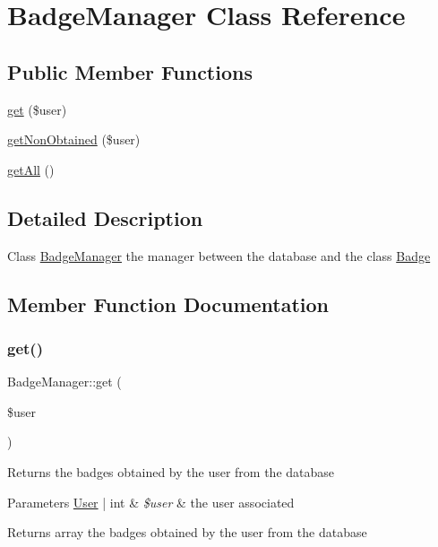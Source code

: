 \hypertarget{classBadgeManager}{}\section{Badge\+Manager Class Reference}
\label{classBadgeManager}
\subsection*{Public Member Functions}
\begin{DoxyCompactItemize}
\item 
\hyperlink{classBadgeManager_a67a4cc6da19d267d51a2fd0c06f526bd}{get} (\$user)
\item 
\hyperlink{classBadgeManager_a145a37b6d0d04785a9f6d01bd013188a}{get\+Non\+Obtained} (\$user)
\item 
\hyperlink{classBadgeManager_a01038b20cae0d0b0bd49ce6a343d33be}{get\+All} ()
\end{DoxyCompactItemize}


\subsection{Detailed Description}
Class \hyperlink{classBadgeManager}{Badge\+Manager} the manager between the database and the class \hyperlink{classBadge}{Badge} 

\subsection{Member Function Documentation}
\mbox{\label{classBadgeManager_a67a4cc6da19d267d51a2fd0c06f526bd}} 
\subsubsection{\texorpdfstring{get()}{get()}}
{\footnotesize\ttfamily Badge\+Manager\+::get (\begin{DoxyParamCaption}\item[{}]{\$user }\end{DoxyParamCaption})}

Returns the badges obtained by the user from the database 
\begin{DoxyParams}[1]{Parameters}
\hyperlink{classUser}{User} | int & {\em \$user} & the user associated \\
\hline
\end{DoxyParams}
\begin{DoxyReturn}{Returns}
array the badges obtained by the user from the database 
\end{DoxyReturn}
\mbox{\label{classBadgeManager_a01038b20cae0d0b0bd49ce6a343d33be}} 

